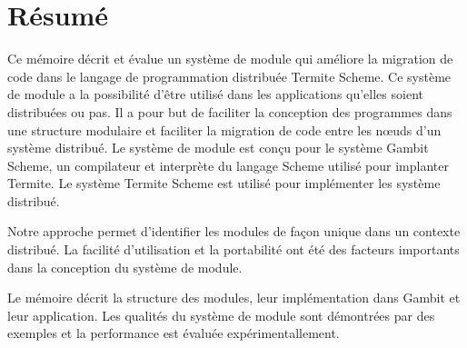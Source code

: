 \documentclass[12pt,maitrise]{dms}
\theoremstyle{definition}
\numberwithin{equation}{section}
\numberwithin{table}{chapter}
\numberwithin{figure}{chapter}
\begin{document}


\maketitle

\maketitle

\chapter*{Résumé}
Ce mémoire décrit et évalue un système de module qui améliore la migration de
code dans le langage de programmation distribuée Termite Scheme. Ce système de
module a la possibilité d'être utilisé dans les applications qu'elles soient
distribuées ou pas.  Il a pour but de faciliter la conception des programmes
dans une structure modulaire et faciliter la migration de code entre les nœuds
d'un système distribué. Le système de module est conçu pour le système Gambit
Scheme, un compilateur et interprète du langage Scheme utilisé pour implanter
Termite. Le système Termite Scheme est utilisé pour implémenter les système
distribué.

Notre approche permet d'identifier les modules
de façon unique dans un contexte distribué. La facilité
d'utilisation et la portabilité ont été des facteurs importants
dans la conception du système de module.

Le mémoire décrit la structure des modules, leur implémentation dans Gambit et
leur application. Les qualités du système de module sont démontrées par des
exemples et la performance est évaluée expérimentallement.
\end{document}
